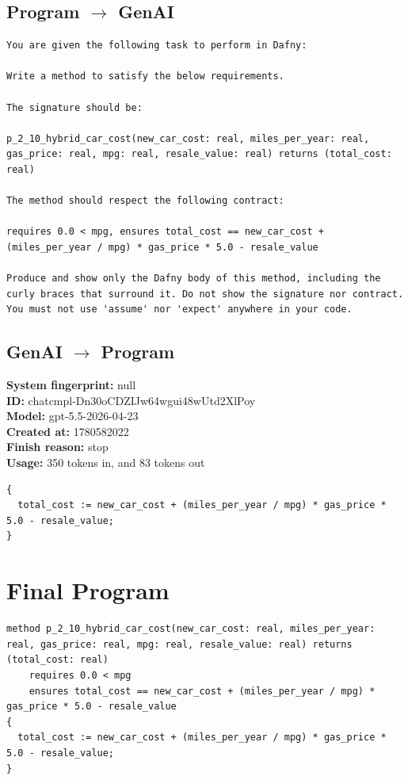 \documentclass{article}
\begin{document}
\subsection*{Program $\rightarrow$ GenAI}
\begin{lstlisting}
You are given the following task to perform in Dafny:

Write a method to satisfy the below requirements.

The signature should be:

p_2_10_hybrid_car_cost(new_car_cost: real, miles_per_year: real, gas_price: real, mpg: real, resale_value: real) returns (total_cost: real)

The method should respect the following contract:

requires 0.0 < mpg, ensures total_cost == new_car_cost + (miles_per_year / mpg) * gas_price * 5.0 - resale_value

Produce and show only the Dafny body of this method, including the curly braces that surround it. Do not show the signature nor contract. You must not use 'assume' nor 'expect' anywhere in your code.
\end{lstlisting}
\subsection*{GenAI $\rightarrow$ Program}
\textbf{System fingerprint: }null
\\\textbf{ID: }chatcmpl-Dn30oCDZIJw64wgui48wUtd2XlPoy
\\\textbf{Model: }gpt-5.5-2026-04-23
\\\textbf{Created at: }1780582022
\\\textbf{Finish reason: }stop
\\\textbf{Usage: }350 tokens in, and 83 tokens out
\begin{lstlisting}
{
  total_cost := new_car_cost + (miles_per_year / mpg) * gas_price * 5.0 - resale_value;
}
\end{lstlisting}
\section*{Final Program}
\begin{lstlisting}
method p_2_10_hybrid_car_cost(new_car_cost: real, miles_per_year: real, gas_price: real, mpg: real, resale_value: real) returns (total_cost: real)
	requires 0.0 < mpg
	ensures total_cost == new_car_cost + (miles_per_year / mpg) * gas_price * 5.0 - resale_value
{
  total_cost := new_car_cost + (miles_per_year / mpg) * gas_price * 5.0 - resale_value;
}
\end{lstlisting}
\end{document}
